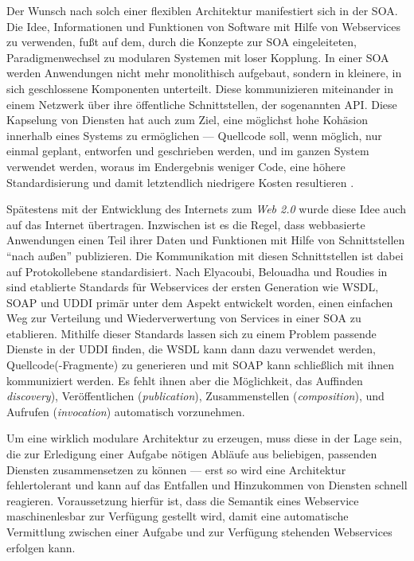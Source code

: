 \label{l:soa}Der Wunsch nach solch einer flexiblen Architektur manifestiert sich in der \ac{SOA}. Die Idee, Informationen und Funktionen von Software mit Hilfe von Webservices zu verwenden, fußt auf dem, durch die Konzepte zur \ac{SOA} eingeleiteten, Paradigmenwechsel zu modularen Systemen mit loser Kopplung. In einer \ac{SOA} werden Anwendungen nicht mehr monolithisch aufgebaut, sondern in kleinere, in sich geschlossene Komponenten unterteilt. Diese kommunizieren miteinander in einem Netzwerk über ihre öffentliche Schnittstellen, der sogenannten \ac{API}. Diese Kapselung von Diensten hat auch zum Ziel, eine möglichst hohe Kohäsion innerhalb eines Systems zu ermöglichen --- Quellcode soll, wenn möglich, nur einmal geplant, entworfen und geschrieben werden, und im ganzen System verwendet werden, woraus im Endergebnis weniger Code, eine höhere Standardisierung und damit letztendlich niedrigere Kosten resultieren \cite[S.62]{hn-web20}. 

Spätestens mit der Entwicklung des Internets zum \emph{Web 2.0} wurde diese Idee auch auf das Internet übertragen. Inzwischen ist es die Regel, dass webbasierte Anwendungen einen Teil ihrer Daten und Funktionen mit Hilfe von Schnittstellen "`nach außen"' publizieren. Die Kommunikation mit diesen Schnittstellen ist dabei auf Protokollebene standardisiert. Nach Elyacoubi, Belouadha und Roudies in \cite[S.653]{ei-sawsdl} sind etablierte Standards für Webservices der ersten Generation wie \ac{WSDL}, \ac{SOAP} und \ac{UDDI} primär unter dem Aspekt entwickelt worden, einen einfachen Weg zur Verteilung und Wiederverwertung von Services in einer \ac{SOA} zu etablieren. Mithilfe dieser Standards lassen sich zu einem Problem passende Dienste in der \ac{UDDI} finden, die \ac{WSDL} kann dann dazu verwendet werden, Quellcode(-Fragmente) zu generieren und mit \ac{SOAP} kann schließlich mit ihnen kommuniziert werden. Es fehlt ihnen aber die Möglichkeit, das Auffinden \emph{discovery}), Veröffentlichen (\emph{publication}), Zusammenstellen (\emph{composition}), und Aufrufen (\emph{invocation}) automatisch vorzunehmen.

\label{l:intro-loosecoupling}Um eine wirklich modulare Architektur zu erzeugen, muss diese in der Lage sein, die zur Erledigung einer Aufgabe nötigen Abläufe aus beliebigen, passenden Diensten zusammensetzen zu können --- erst so wird eine Architektur fehlertolerant und kann auf das Entfallen und Hinzukommen von Diensten schnell reagieren. Voraussetzung hierfür ist, dass die Semantik eines Webservice maschinenlesbar zur Verfügung gestellt wird, damit eine automatische Vermittlung zwischen einer Aufgabe und zur Verfügung stehenden Webservices erfolgen kann.


